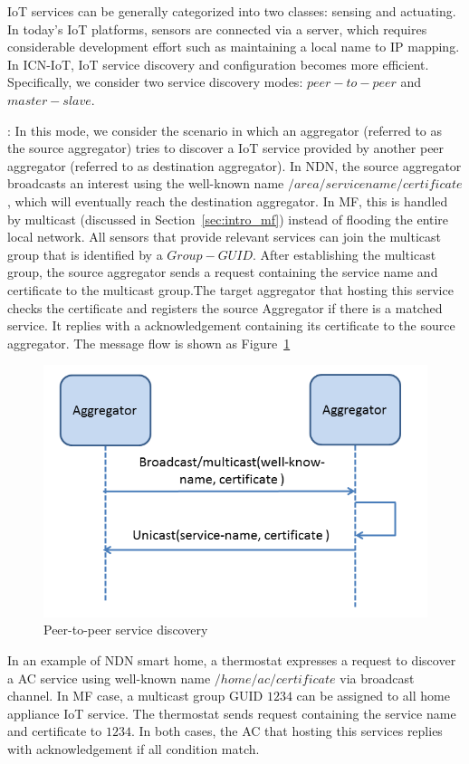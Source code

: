 IoT services can be generally categorized into two classes: sensing and actuating. In today's IoT platforms, sensors are connected via a server, which requires considerable development effort such as maintaining a local name to IP mapping. In ICN-IoT, IoT service discovery and configuration becomes more efficient. Specifically, we consider two service discovery modes: $peer-to-peer$ and $master-slave$.


\vspace{1mm}: In this mode, we consider the scenario in which an aggregator (referred to as the source aggregator) tries to discover a IoT service provided by another peer aggregator (referred to as destination aggregator). In NDN, the source aggregator broadcasts an interest using the well-known name $/area/servicename/certificate$, which will eventually reach the destination aggregator. In MF, this is handled by multicast (discussed in Section~\ref{sec:intro_mf}) instead of flooding the entire local network. All sensors that provide relevant services can join the multicast group that is identified by a $Group-GUID$. After establishing the multicast group, the source aggregator sends a request containing the service name and certificate to the multicast group.The target aggregator that hosting this service checks the certificate and registers the source Aggregator if there is a matched service. It replies with a acknowledgement containing its certificate to the source aggregator. The message flow is shown as Figure~\ref{fig:ser_dis}
\begin{figure}
\includegraphics[width=\columnwidth]{figure/service_discovery.png}
\caption{\label{fig:ser_dis}Peer-to-peer service discovery}
\end{figure}
In an example of NDN smart home, a thermostat expresses a request to discover a AC service using well-known name $/home/ac/certificate$ via broadcast channel. In MF case, a multicast group GUID $1234$ can be assigned to all home appliance IoT service. The thermostat sends request containing the service name and certificate to $1234$. In both cases, the AC that hosting this services replies with acknowledgement if all condition match.

